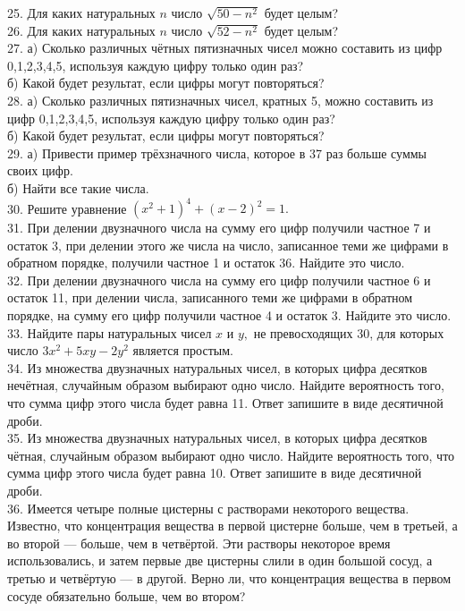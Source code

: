 25. Для каких натуральных $n$ число $\sqrt{50-n^2}$ будет целым?\\
26. Для каких натуральных $n$ число $\sqrt{52-n^2}$ будет целым?\\
27. а) Сколько различных чётных пятизначных чисел можно составить из цифр 0,1,2,3,4,5, используя каждую цифру только один раз?\\
б) Какой будет результат, если цифры могут повторяться?\\
28. а) Сколько различных пятизначных чисел, кратных 5, можно составить из цифр 0,1,2,3,4,5, используя каждую цифру только один раз?\\
б) Какой будет результат, если цифры могут повторяться?\\
29. а) Привести пример трёхзначного числа, которое в 37 раз больше суммы своих цифр.\\
б) Найти все такие числа.\\
30. Решите уравнение $(x^2+1)^4+(x-2)^2=1.$\\
31. При делении двузначного числа на сумму его цифр получили частное 7 и остаток 3, при делении этого же числа на число, записанное теми же цифрами в обратном порядке, получили частное 1 и остаток 36. Найдите это число.\\
32. При делении двузначного числа на сумму его цифр получили частное 6 и остаток 11, при делении числа, записанного теми же цифрами в обратном порядке, на сумму его цифр получили частное 4 и остаток 3. Найдите это число.\\
33. Найдите пары натуральных чисел $x$ и $y,$ не превосходящих 30, для которых число $3x^2+5xy-2y^2$ является простым.\\
34. Из множества двузначных натуральных чисел, в которых цифра десятков нечётная, случайным образом выбирают одно число. Найдите вероятность того, что сумма цифр этого числа будет равна 11. Ответ запишите в виде десятичной дроби.\\
35. Из множества двузначных натуральных чисел, в которых цифра десятков чётная, случайным образом выбирают одно число. Найдите вероятность того, что сумма цифр этого числа будет равна 10. Ответ запишите в виде десятичной дроби.\\
36. Имеется четыре полные цистерны с растворами некоторого вещества. Известно, что концентрация вещества в первой цистерне больше, чем в третьей, а во второй --- больше, чем в четвёртой. Эти растворы некоторое время использовались, и затем первые две цистерны слили в один большой сосуд, а третью и четвёртую --- в другой. Верно ли, что концентрация вещества в первом сосуде обязательно больше, чем во втором?\\
